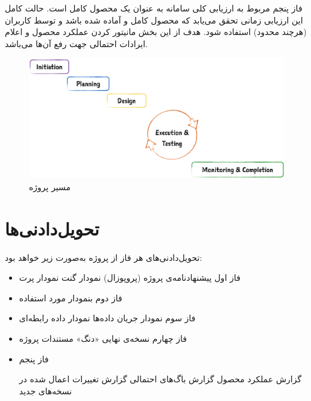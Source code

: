 فاز پنجم مربوط به ارزیابی کلی سامانه به عنوان یک محصول کامل است. حالت کامل این ارزیابی زمانی تحقق می‌یابد که محصول کامل و آماده شده باشد و توسط کاربران (هرچند محدود) استفاده شود.
هدف از این بخش مانیتور کردن عملکرد محصول و اعلام ایرادات احتمالی جهت رفع آن‌ها می‌باشد.

\begin{figure}[h]
	\centering\includegraphics[scale=0.25]{proj_phases}
	\caption{مسیر پروژه}
	\label{phases} %
\end{figure}

\pagebreak
\section{تحویل‌دادنی‌ها}
تحویل‌دادنی‌های هر فاز از پروژه به‌صورت زیر خواهد بود:

\begin{itemize}
	\item 
	فاز اول
	\subitem
	پیشنهادنامه‌ی پروژه (پروپوزال)
	\subitem نمودار گنت 
	\subitem نمودار پرت 
	\item 
	فاز دوم
	\subitem  بنمودار مورد استفاده

	
	\item 
	فاز سوم
	\subitem نمودار جریان داده‌ها 
	\subitem
	نمودار داده رابطه‌ای
	
	\item 
فاز چهارم
	\subitem نسخه‌ی نهایی «دنگ‌»
	\subitem مستندات پروژه
	
	\item 
	فاز پنجم
	
	\subitem گزارش عملکرد محصول
	\subitem گزارش باگ‌های احتمالی
	\subitem گزارش تغییرات اعمال شده در نسخه‌های جدید
\end{itemize}